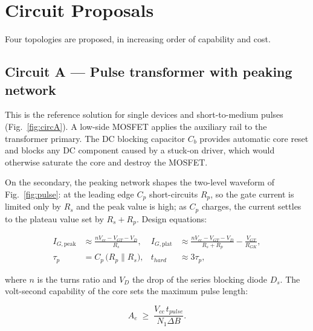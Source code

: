 \documentclass[11pt,a4paper]{article}
\begin{document}
\section{Circuit Proposals}

Four topologies are proposed, in increasing order of capability and cost.

\subsection{Circuit A --- Pulse transformer with peaking network}

This is the reference solution for single devices and short-to-medium pulses
(Fig.~\ref{fig:circA}). A low-side MOSFET applies the auxiliary rail to the
transformer primary. The DC blocking capacitor $C_b$ provides automatic core reset
and blocks any DC component caused by a stuck-on driver, which would otherwise
saturate the core and destroy the MOSFET.

On the secondary, the peaking network shapes the two-level waveform of
Fig.~\ref{fig:pulse}: at the leading edge $C_p$ short-circuits $R_p$, so the gate
current is limited only by $R_s$ and the peak value is high; as $C_p$ charges, the
current settles to the plateau value set by $R_s + R_p$. Design equations:

\begin{align}
  I_{G,\text{peak}} &\approx \frac{n V_{cc} - V_{GT} - V_{D}}{R_s},
  &
  I_{G,\text{plat}} &\approx \frac{n V_{cc} - V_{GT} - V_{D}}{R_s + R_p}
      - \frac{V_{GT}}{R_{GK}},
  \label{eq:peak}\\[1mm]
  \tau_p &= C_p\,\big(R_p \parallel R_s\big),
  &
  t_{hard} &\approx 3\tau_p ,
\end{align}

where $n$ is the turns ratio and $V_D$ the drop of the series blocking diode $D_s$.
The volt-second capability of the core sets the maximum pulse length:

\begin{equation}
  A_e \;\ge\; \frac{V_{cc}\, t_{pulse}}{N_1 \Delta B}.
  \label{eq:volt-sec}
\end{equation}
\end{document}
